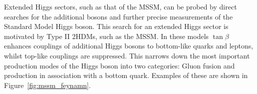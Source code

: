 Extended Higgs sectors, such as that of the MSSM, can be probed by direct searches for the additional bosons and further precise measurements of the Standard Model Higgs boson. 
This search for an extended Higgs sector is motivated by Type II 2HDMs, such as the MSSM.
In these models $\tan\beta$ enhances couplings of additional Higgs bosons to bottom-like quarks and leptons, whilst top-like couplings are suppressed.
This narrows down the most important production modes of the Higgs boson into two categories: Gluon fusion and production in association with a bottom quark.
Examples of these are shown in Figure~\ref{fig:mssm_feynamn}.

\begin{figure}[H]
\centering
\begin{subfigure}[b]{0.3\textwidth}
\caption{}
\end{subfigure}



\end{figure}
